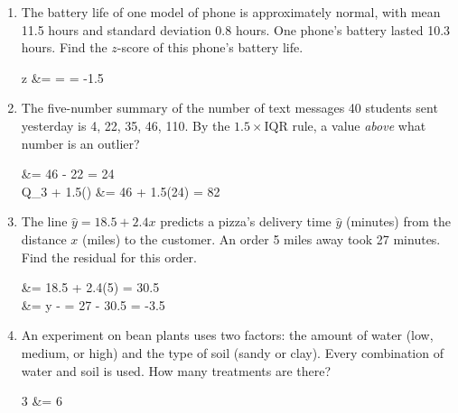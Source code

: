 \documentclass[12pt]{article}
\begin{document}
\begin{enumerate}[leftmargin=1.9em, itemsep=0.16in, resume]

  \boxguard[11]
  \item The battery life of one model of phone is approximately normal, with mean 11.5 hours
        and standard deviation 0.8 hours. One phone's battery lasted 10.3 hours. Find the
        $z$-score of this phone's battery life.
        \begin{work}
          z &=  =  = -1.5
        \end{work}
        \vspace{0.62in}

  \boxguard[11]
  \item The five-number summary of the number of text messages 40 students sent yesterday is
        4, 22, 35, 46, 110. By the $1.5 \times \text{IQR}$ rule, a value \emph{above} what
        number is an outlier?
        \begin{work}
           &= 46 - 22 = 24 \\
          Q_3 + 1.5() &= 46 + 1.5(24) = 82
        \end{work}
        \vspace{0.50in}

  \boxguard[11]
  \item The line $\hat{y} = 18.5 + 2.4x$ predicts a pizza's delivery time $\hat{y}$ (minutes)
        from the distance $x$ (miles) to the customer. An order 5 miles away took 27 minutes.
        Find the residual for this order.
        \begin{work}
           &= 18.5 + 2.4(5) = 30.5 \\
           &= y -  = 27 - 30.5 = -3.5
        \end{work}
        \vspace{0.50in}

  \boxguard[10]
  \item An experiment on bean plants uses two factors: the amount of water (low, medium, or
        high) and the type of soil (sandy or clay). Every combination of water and soil is
        used. How many treatments are there?
        \begin{work}
          3    &= 6 
        \end{work}
        \vspace{0.60in}


\end{enumerate}
\end{document}
